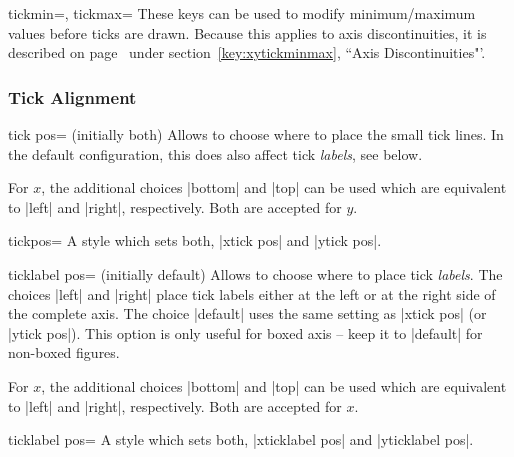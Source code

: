 \begin{pgfplotsxykeylist}{\x tickmin=, \x tickmax=}
	These keys can be used to modify minimum/maximum values before ticks are drawn. Because this applies to axis discontinuities, it is described on page~\pageref{key:xytickminmax} under section~\ref{key:xytickminmax}, ``Axis Discontinuities"'.
\end{pgfplotsxykeylist}

\subsubsection{Tick Alignment}

\begin{pgfplotsxykey}{\x tick pos= (initially both)}
Allows to choose where to place the small tick lines. In the default configuration, this does also affect tick \emph{labels}, see below.

For $x$, the additional choices |bottom| and |top| can be used which are equivalent to |left| and |right|, respectively. Both are accepted for $y$.
\end{pgfplotsxykey}

\begin{pgfplotskey}{tickpos=}
	A style which sets both, |xtick pos| and |ytick pos|.
\end{pgfplotskey}

\begin{pgfplotsxykey}{\x ticklabel pos= (initially default)}
Allows to choose where to place tick \emph{labels}. The choices |left| and |right| place tick labels either at the left or at the right side of the complete axis. The choice |default| uses the same setting as |xtick pos| (or |ytick pos|). This option is only useful for boxed axis -- keep it to |default| for non-boxed figures.

For $x$, the additional choices |bottom| and |top| can be used which are equivalent to |left| and |right|, respectively. Both are accepted for $x$.
\end{pgfplotsxykey}

\begin{pgfplotskey}{ticklabel pos=}
	A style which sets both, |xticklabel pos| and |yticklabel pos|.
\end{pgfplotskey}


